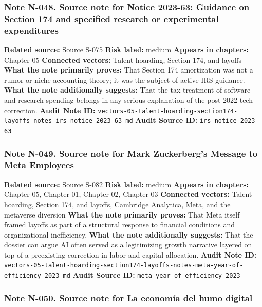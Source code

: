 \documentclass[
  american,
  11pt,
  letterpaper,
]{article}
\begin{document}
\subsubsection{Note N-048. Source note for Notice 2023-63: Guidance on
Section 174 and specified research or experimental
expenditures}\label{note-n-048-vectors-05-talent-hoarding-section174-layoffs-notes-irs-notice-2023-63-md}

\textbf{Related source:}
\hyperref[source-s-075-notice-2023-63-guidance-on-section-174-and-specified-research-or-experimental-expenditures]{Source
S-075} \textbf{Risk label:} medium \textbf{Appears in chapters:} Chapter
05 \textbf{Connected vectors:} Talent hoarding, Section 174, and layoffs
\textbf{What the note primarily proves:} That Section 174 amortization
was not a rumor or niche accounting theory; it was the subject of active
IRS guidance. \textbf{What the note additionally suggests:} That the tax
treatment of software and research spending belongs in any serious
explanation of the post-2022 tech correction. \textbf{Audit Note ID:}
\texttt{vectors-05-talent-hoarding-section174-layoffs-notes-irs-notice-2023-63-md}
\textbf{Audit Source ID:} \texttt{irs-notice-2023-63}

\subsubsection{Note N-049. Source note for Mark Zuckerberg's Message to
Meta
Employees}\label{note-n-049-vectors-05-talent-hoarding-section174-layoffs-notes-meta-year-of-efficiency-2023-md}

\textbf{Related source:}
\hyperref[source-s-082-mark-zuckerberg-s-message-to-meta-employees]{Source
S-082} \textbf{Risk label:} medium \textbf{Appears in chapters:} Chapter
05, Chapter 01, Chapter 02, Chapter 03 \textbf{Connected vectors:}
Talent hoarding, Section 174, and layoffs, Cambridge Analytica, Meta,
and the metaverse diversion \textbf{What the note primarily proves:}
That Meta itself framed layoffs as part of a structural response to
financial conditions and organizational inefficiency. \textbf{What the
note additionally suggests:} That the dossier can argue AI often served
as a legitimizing growth narrative layered on top of a preexisting
correction in labor and capital allocation. \textbf{Audit Note ID:}
\texttt{vectors-05-talent-hoarding-section174-layoffs-notes-meta-year-of-efficiency-2023-md}
\textbf{Audit Source ID:} \texttt{meta-year-of-efficiency-2023}

\subsubsection{Note N-050. Source note for La economía del humo
digital}\label{note-n-050-vectors-05-talent-hoarding-section174-layoffs-notes-paul-lara-digital-smoke-economy-2026-md}
\end{document}
